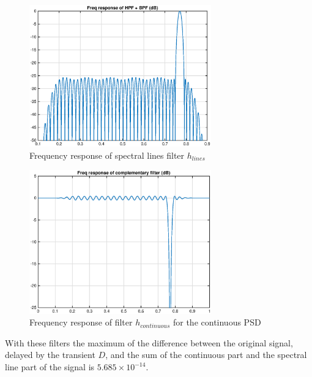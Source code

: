 \documentclass[10pt]{article}
\numberwithin{equation}{section}
\begin{document}
\begin{figure}[h!]
  \centering
  \includegraphics[width = 0.7\textwidth]{images/filter_lines}
  \caption{Frequency response of spectral lines filter $h_{lines}$}
  \label{fig:line_filt}
\end{figure}

\begin{figure}[h!]
  \centering
  \includegraphics[width = 0.7\textwidth]{images/filter_continuous}
  \caption{Frequency response of filter $h_{continuous}$ for the continuous PSD}
  \label{fig:cont_filt}
\end{figure}

With these filters the maximum of the difference between the original signal, delayed by the transient $D$, and the sum of the continuous part and the spectral line part of the signal is $5.685 \times 10^{-14}$. \\
\end{document}
